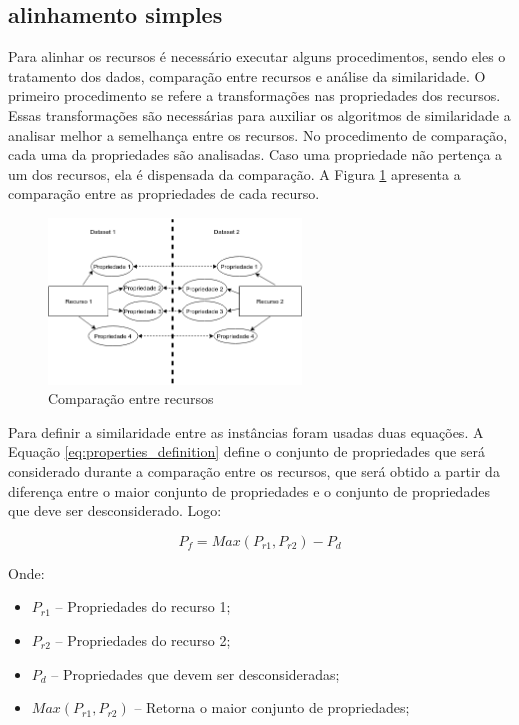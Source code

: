 \subsection{alinhamento simples}
\label{im_simples}
Para alinhar os recursos é necessário executar alguns procedimentos, sendo eles o tratamento dos dados, comparação entre recursos e análise da similaridade. O primeiro procedimento se refere a transformações nas propriedades dos recursos. Essas transformações são necessárias para auxiliar os algoritmos de similaridade a analisar melhor a semelhança entre os recursos. No procedimento de comparação, cada uma da propriedades são analisadas. Caso uma propriedade não pertença a um dos recursos, ela é dispensada da comparação. A Figura  \ref{fig:resources} apresenta a comparação entre as propriedades de cada recurso.

\begin{figure}[!ht]
	\centering
	\includegraphics[width=0.6\textwidth]{./imagens/resources.png}
    \caption{Comparação entre recursos}
	\label{fig:resources}
\end{figure}

Para definir a similaridade entre as instâncias foram usadas duas equações. A Equação \ref{eq:properties_definition} define o conjunto de propriedades que será considerado durante a comparação entre os recursos, que será obtido a partir da diferença entre  o maior conjunto de propriedades e o conjunto de propriedades que deve ser desconsiderado. Logo:

\begin{equation}
P_f =M a x  ( P_{r1} ,P_{r2} ) - P_d
\label{eq:properties_definition}
\end{equation}

Onde:
\begin{itemize}
	\item $P_{r1}$ – Propriedades do recurso 1;
	\item $P_{r2}$ –  Propriedades do recurso 2;
	\item $P_d$ –  Propriedades que devem ser desconsideradas;
	\item $M a x  ( P_{r1} ,P_{r2} )$ – Retorna o maior conjunto de propriedades;
\end{itemize}

